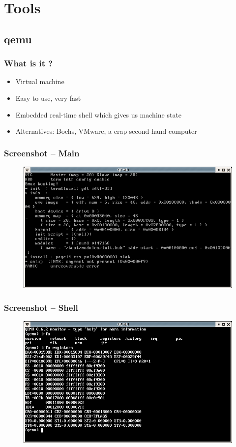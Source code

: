 \documentclass{beamer}
\begin{document}
\section{Tools}

\subsection{qemu}

\begin{frame}
  \frametitle{What is it ?}

  \begin{itemize}
  \item
    Virtual machine
  \item
    Easy to use, very fast
  \item
    Embedded real-time shell which gives us machine state
  \item
    Alternatives: Bochs, VMware, a crap second-hand computer
  \end{itemize}
\end{frame}

\begin{frame}
  \frametitle{Screenshot -- Main}

  \begin{figure}
  \includegraphics[scale=0.43]{qemu-1.png}
  \end{figure}
\end{frame}

\begin{frame}
  \frametitle{Screenshot -- Shell}

  \begin{figure}
  \includegraphics[scale=0.43]{qemu-2.png}
  \end{figure}
\end{frame}
\end{document}
